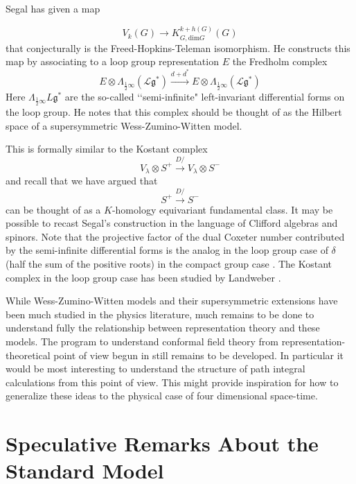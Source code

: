 \documentclass[a4paper,a4paper]{article}
\theoremstyle{conjecture}
\def\Slash#1{#1\!\!\!\!/}
\def\Dirac{\Slash D}
\begin{document}
Segal has given\cite{Segal-Rutgers} a map

$$V_k(G)\longrightarrow K_{G,\text {dim} G}^{k+h(G)}(G)$$ that conjecturally is the
Freed-Hopkins-Teleman isomorphism.  He constructs this map by associating to a loop group representation
$E$ the Fredholm complex 
$$E\otimes \Lambda_{\frac{1}{2}\infty}(\mathcal L\mathfrak
g^*)\stackrel{d+d^*}\longrightarrow E\otimes \Lambda_{\frac{1}{2}\infty}(\mathcal L\mathfrak g^*)$$ 
Here
$\Lambda_{\frac{1}{2}\infty}L\mathfrak g^*$ are the so-called \lq\lq semi-infinite" left-invariant
differential forms on the loop group.  He notes that this complex should be thought of as the Hilbert
space of a supersymmetric Wess-Zumino-Witten model.

This is formally similar to the Kostant complex
$$V_\lambda\otimes S^+\stackrel{\Dirac}\longrightarrow V_\lambda\otimes S^-$$
and recall that we have argued that
$$S^+\stackrel{\Dirac}\longrightarrow S^-$$
can be thought of as a $K$-homology equivariant fundamental class.  It may be possible to recast Segal's
construction in the language of Clifford algebras and spinors.  Note that the projective factor of the
dual Coxeter number contributed by the semi-infinite differential forms is the analog in the loop
group case of $\delta$ (half the sum of the positive roots) in the compact group case \cite{Freed1}.
The Kostant complex in the loop group case has been studied by Landweber \cite{Landweber2}.

While Wess-Zumino-Witten models and their supersymmetric extensions have been much studied in the physics
literature, much remains to be done to understand fully the relationship between representation theory
and these models.  The program to understand conformal field theory from representation-theoretical point of
view begun in \cite{Segal1} still remains to be developed. In particular it would be most interesting to
understand the structure of path integral calculations from this point of view.  This might provide
inspiration for how to generalize these ideas to the physical case of four dimensional space-time.


\section{Speculative Remarks About the Standard Model}
\end{document}
